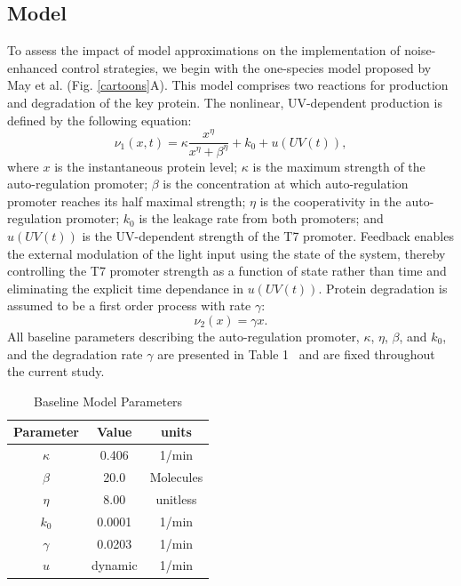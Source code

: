 \documentclass[12pt]{iopart}
\begin{document}
\subsection{Model}\label{sec:Model}
To assess the impact of model approximations on the implementation of noise-enhanced control strategies, we begin with the one-species model proposed by May et al. \cite{May2021} (Fig. \ref{cartoons}A). 
This model comprises two reactions for production and degradation of the key protein. 
The nonlinear, UV-dependent production is defined by the following equation:
\begin{equation}
\nu_1(x,t)= \kappa\frac{x^\eta}{x^\eta+\beta^\eta}+ k_0 + u(UV(t)),
\label{prodRate}
\end{equation}
%
%
where $x$ is the instantaneous protein level; $\kappa$ is the maximum strength of the auto-regulation promoter; $\beta$ is the concentration at which auto-regulation promoter reaches its half maximal strength; $\eta$ is the cooperativity in the auto-regulation promoter; $k_0$ is the leakage rate from both promoters; and $u(UV(t))$ is the UV-dependent strength of the T7 promoter. 
Feedback enables the external modulation of the light input using the state of the system, thereby controlling the T7 promoter strength as a function of state rather than time and eliminating the explicit time dependance in $u(UV(t))$.
Protein degradation is assumed to be a first order process with rate $\gamma$:
\begin{equation}
\nu_2(x) = \gamma x.
\end{equation}
All baseline parameters describing the auto-regulation promoter, $\kappa$, $\eta$, $\beta$, and $k_0$, and the degradation rate $\gamma$ are presented in Table 1~\cite{May2021} and are fixed throughout the current study.

\begin{table}[]
\caption{Baseline Model Parameters}
\begin{center}
\begin{tabular}{|c|c|c|}
\hline
Parameter & Value   & units                     \\ \hline \hline
$\kappa$         & 0.406   & 1/min \\ \hline
$\beta$          & 20.0    & Molecules            \\  \hline
$\eta $           & 8.00    & unitless          \\  \hline
$k_0$           & 0.0001  & 1/min \\  \hline
$\gamma$         & 0.0203  & 1/min         \\  \hline
$u$              & dynamic & 1/min \\ \hline
\end{tabular}
\label{table}
\end{center}
\vspace{-0.2in}
\end{table}
\end{document}
